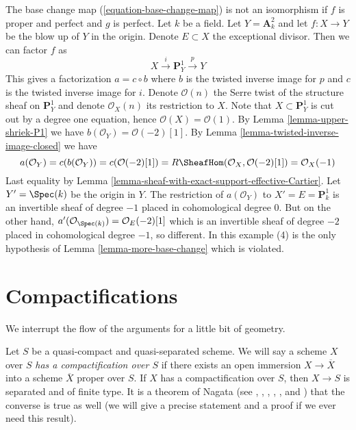 \begin{example}
\label{example-base-change-wrong}
The base change map (\ref{equation-base-change-map}) is not an
isomorphism if $f$ is proper and perfect and $g$ is perfect.
Let $k$ be a field. Let $Y = \mathbf{A}^2_k$ and let $f : X \to Y$
be the blow up of $Y$ in the origin. Denote $E \subset X$ the
exceptional divisor. Then we can factor $f$ as
$$
X \xrightarrow{i} \mathbf{P}^1_Y \xrightarrow{p} Y
$$
This gives a factorization $a = c \circ b$ where $b$ is the
twisted inverse image for $p$ and $c$ is the twisted
inverse image for $i$. Denote $\mathcal{O}(n)$ the
Serre twist of the structure sheaf on $\mathbf{P}^1_Y$ and
denote $\mathcal{O}_X(n)$ its restriction to $X$.
Note that $X \subset \mathbf{P}^1_Y$ is cut out by
a degree one equation, hence $\mathcal{O}(X) = \mathcal{O}(1)$.
By Lemma \ref{lemma-upper-shriek-P1} we have
$b(\mathcal{O}_Y) = \mathcal{O}(-2)[1]$.
By Lemma \ref{lemma-twisted-inverse-image-closed}
we have
$$
a(\mathcal{O}_Y) = c(b(\mathcal{O}_Y)) =
c(\mathcal{O}(-2)[1]) =
R\SheafHom(\mathcal{O}_X, \mathcal{O}(-2)[1]) =
\mathcal{O}_X(-1)
$$
Last equality by Lemma \ref{lemma-sheaf-with-exact-support-effective-Cartier}.
Let $Y' = \Spec(k)$ be the origin in $Y$. The restriction of
$a(\mathcal{O}_Y)$ to $X' = E = \mathbf{P}^1_k$
is an invertible sheaf of degree $-1$ placed in cohomological
degree $0$. But on the other hand,
$a'(\mathcal{O}_{\Spec(k)}) = \mathcal{O}_E(-2)[1]$
which is an invertible sheaf of degree $-2$ placed in
cohomological degree $-1$, so different. In this example
(4) is the only hypothesis of Lemma \ref{lemma-more-base-change}
which is violated.
\end{example}







\section{Compactifications}
\label{section-compactify}

\noindent
We interrupt the flow of the arguments for a little bit of geometry.

\medskip\noindent
Let $S$ be a quasi-compact and quasi-separated scheme. We will say a
scheme $X$ over $S$ {\it has a compactification over $S$} if there exists
an open immersion $X \to \overline{X}$ into a scheme $\overline{X}$
proper over $S$. If $X$ has a compactification over $S$, then $X \to S$
is separated and of finite type. It is a theorem of Nagata (see
\cite{Lutkebohmert}, \cite{Conrad-Nagata}, \cite{Nagata-1},
\cite{Nagata-2}, \cite{Nagata-3}, and \cite{Nagata-4}) that the converse is
true as well (we will give a
precise statement and a proof if we ever need this result).

